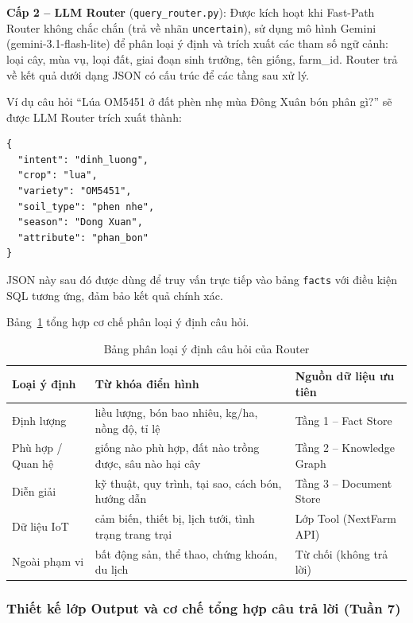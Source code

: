 \textbf{Cấp 2 -- LLM Router} (\texttt{query\_router.py}): Được kích hoạt khi Fast-Path Router không chắc chắn (trả về nhãn \texttt{uncertain}), sử dụng mô hình Gemini (gemini-3.1-flash-lite) để phân loại ý định và trích xuất các tham số ngữ cảnh: loại cây, mùa vụ, loại đất, giai đoạn sinh trưởng, tên giống, farm\_id. Router trả về kết quả dưới dạng JSON có cấu trúc để các tầng sau xử lý.

Ví dụ câu hỏi ``Lúa OM5451 ở đất phèn nhẹ mùa Đông Xuân bón phân gì?'' sẽ được LLM Router trích xuất thành:
\begin{verbatim}
{
  "intent": "dinh_luong",
  "crop": "lua",
  "variety": "OM5451",
  "soil_type": "phen nhe",
  "season": "Dong Xuan",
  "attribute": "phan_bon"
}
\end{verbatim}
JSON này sau đó được dùng để truy vấn trực tiếp vào bảng \texttt{facts} với điều kiện SQL tương ứng, đảm bảo kết quả chính xác.

Bảng~\ref{tab:router-intent} tổng hợp cơ chế phân loại ý định câu hỏi.

\begin{table}[H]
\caption{Bảng phân loại ý định câu hỏi của Router}
\label{tab:router-intent}
\centering
\begin{tabular}{|p{3.5cm}|p{5cm}|p{5cm}|}
\hline
\textbf{Loại ý định} & \textbf{Từ khóa điển hình} & \textbf{Nguồn dữ liệu ưu tiên} \\
\hline
Định lượng & liều lượng, bón bao nhiêu, kg/ha, nồng độ, tỉ lệ & Tầng 1 -- Fact Store \\
\hline
Phù hợp / Quan hệ & giống nào phù hợp, đất nào trồng được, sâu nào hại cây & Tầng 2 -- Knowledge Graph \\
\hline
Diễn giải & kỹ thuật, quy trình, tại sao, cách bón, hướng dẫn & Tầng 3 -- Document Store \\
\hline
Dữ liệu IoT & cảm biến, thiết bị, lịch tưới, tình trạng trang trại & Lớp Tool (NextFarm API) \\
\hline
Ngoài phạm vi & bất động sản, thể thao, chứng khoán, du lịch & Từ chối (không trả lời) \\
\hline
\end{tabular}
\end{table}

\subsubsection{Thiết kế lớp Output và cơ chế tổng hợp câu trả lời (Tuần 7)}

